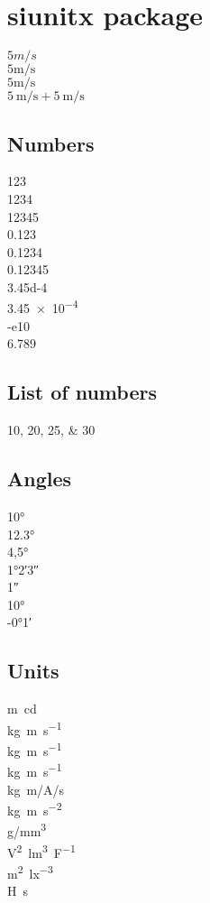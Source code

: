 \documentclass[12pt]{article}
\begin{document}
\section*{siunitx package}

$5 m/s$ \\
$5 \mathrm{m}/\mathrm{s}$ \\
$5\unit{\m\per\s}$ \\
$\qty{5}{\m\per\s} + \qty{5}{\m\per\s}$

\subsection*{Numbers}
\num{123} \\
\num{1234} \\
\num{12345} \\
\num{0.123} \\
\num{0,1234} \\
\num{.12345} \\
\num{3.45d-4} \\
\num{3.45e-4} \\
\num{-e10} \\
\num[locale = DE]{6.789}

\subsection*{List of numbers}
\numlist{10;20;25;30}

\subsection*{Angles}
\ang{10} \\
\ang{12.3} \\
\ang{4,5} \\
\ang{1;2;3} \\
\ang{;;1} \\
\ang{+10;;} \\
\ang{-0;1;}

\subsection*{Units}
\unit{\m\candela} \\
\unit{kg.m.s^{-1}} \\
\unit{\kilogram\metre\per\second} \\
\unit{\kg\m\per\s} \\
\unit[per-mode = symbol]{\kilogram\metre\per\ampere\per\second}\\
\unit{\kilo\gram\metre\per\square\second} \\
\unit[per-mode = symbol]{\gram\per\cubic\milli\metre} \\
\unit{\square\volt\cubic\lumen\per\farad} \\
\unit{\metre\squared\per\cubic\lux} \\
\unit{\henry\second}
\end{document}
